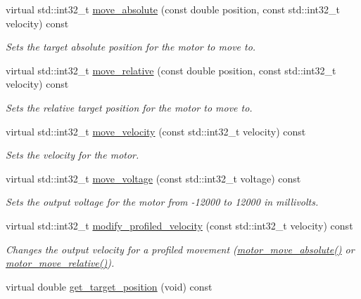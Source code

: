\begin{DoxyCompactItemize}
virtual std\+::int32\+\_\+t \mbox{\hyperlink{classpros_1_1Motor_a7851ffa40c9803d75398a5be355de395}{move\+\_\+absolute}} (const double position, const std\+::int32\+\_\+t velocity) const
\begin{DoxyCompactList}\small\item\em Sets the target absolute position for the motor to move to. \end{DoxyCompactList}\item 
virtual std\+::int32\+\_\+t \mbox{\hyperlink{classpros_1_1Motor_a96c09e169b5135d9001cec92fa2686c1}{move\+\_\+relative}} (const double position, const std\+::int32\+\_\+t velocity) const
\begin{DoxyCompactList}\small\item\em Sets the relative target position for the motor to move to. \end{DoxyCompactList}\item 
virtual std\+::int32\+\_\+t \mbox{\hyperlink{classpros_1_1Motor_a797de937c2d550c3fa199806db07dbcc}{move\+\_\+velocity}} (const std\+::int32\+\_\+t velocity) const
\begin{DoxyCompactList}\small\item\em Sets the velocity for the motor. \end{DoxyCompactList}\item 
virtual std\+::int32\+\_\+t \mbox{\hyperlink{classpros_1_1Motor_a3c79db57c20617fbbc49461c58612cfb}{move\+\_\+voltage}} (const std\+::int32\+\_\+t voltage) const
\begin{DoxyCompactList}\small\item\em Sets the output voltage for the motor from -\/12000 to 12000 in millivolts. \end{DoxyCompactList}\item 
virtual std\+::int32\+\_\+t \mbox{\hyperlink{classpros_1_1Motor_a44f39232cec1caee6d668d8ff21dc28b}{modify\+\_\+profiled\+\_\+velocity}} (const std\+::int32\+\_\+t velocity) const
\begin{DoxyCompactList}\small\item\em Changes the output velocity for a profiled movement (\mbox{\hyperlink{motors_8h_ab70bf4937f1b5cefa15c11c15314c90e}{motor\+\_\+move\+\_\+absolute()}} or \mbox{\hyperlink{motors_8h_ab4c1ba35d69e8e9b49df0e848fa305d3}{motor\+\_\+move\+\_\+relative()}}). \end{DoxyCompactList}\item 
virtual double \mbox{\hyperlink{classpros_1_1Motor_a7ad83a73bf15b94aaad8d10970bb254c}{get\+\_\+target\+\_\+position}} (void) const

\end{DoxyCompactItemize}
